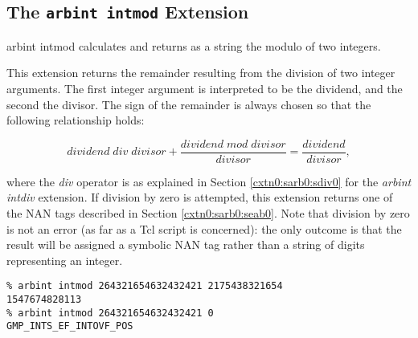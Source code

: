 \subsection{The \texttt{arbint intmod} Extension}
\label{cxtn0:sarb0:smod0}

\begin{tclcommandname}{arbint intmod}%
calculates and returns as a string the modulo of two integers.
\end{tclcommandname}

\begin{tclcommandsynopsis}
\end{tclcommandsynopsis}

\begin{tclcommanddescription}
This extension returns the remainder resulting from the 
division of two integer arguments.
The first integer argument is interpreted to be the dividend,
and the second the divisor.  The sign of the remainder is always 
chosen so that the following relationship holds:

\begin{equation}
dividend \; div \; divisor + \frac{dividend \; mod \; divisor}{divisor} 
= \frac{dividend}{divisor},
\end{equation}

where the \emph{div} operator is as explained in Section
\ref{cxtn0:sarb0:sdiv0} for the \emph{arbint intdiv} extension.
If division by zero is attempted, this extension 
returns one of the NAN tags described in
Section \ref{cxtn0:sarb0:seab0}.  Note that division
by zero is not an error (as far as a Tcl script is concerned):
the only outcome is that the result will be assigned a symbolic
NAN tag rather than a string of digits representing an integer.
\end{tclcommanddescription}

\begin{tclcommandsampleinvocations}
\begin{scriptsize}
\begin{verbatim}
% arbint intmod 264321654632432421 2175438321654
1547674828113
% arbint intmod 264321654632432421 0
GMP_INTS_EF_INTOVF_POS
\end{verbatim}
\end{scriptsize}
\end{tclcommandsampleinvocations}

